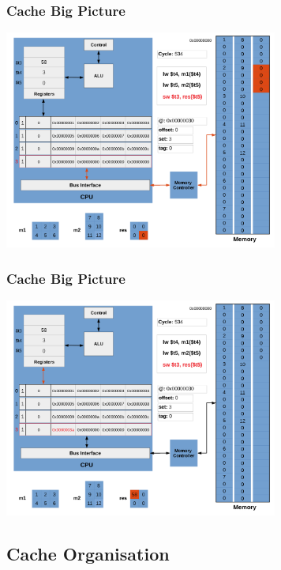 \documentclass{beamer}
\begin{document}
\begin{frame}[fragile]
\frametitle{Cache Big Picture}

\begin{center}
\vspace*{-0.23cm}
\hspace*{-1cm}\includegraphics[width=9cm]{cache41.pdf}
\end{center}

\end{frame}

\begin{frame}[fragile]
\frametitle{Cache Big Picture}

\begin{center}
\vspace*{-0.23cm}
\hspace*{-1cm}\includegraphics[width=9cm]{cache42.pdf}
\end{center}

\end{frame}

\subsection{Cache Organisation}
\end{document}
